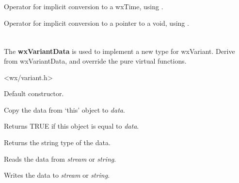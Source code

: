 
Operator for implicit conversion to a wxTime, using .

\label{wxvariantvoid}


Operator for implicit conversion to a pointer to a void, using .

\section{}\label{wxvariantdata}

The {\bf wxVariantData} is used to implement a new type for wxVariant. Derive from wxVariantData,
and override the pure virtual functions.




<wx/variant.h>




\label{wxvariantdatactor}


Default constructor.

\label{wxvariantdatacopy}


Copy the data from `this' object to {\it data}.

\label{wxvariantdataeq}


Returns TRUE if this object is equal to {\it data}.

\label{wxvariantdatagettype}


Returns the string type of the data.

\label{wxvariantdataread}



Reads the data from {\it stream} or {\it string}.

\label{wxvariantdatawrite}



Writes the data to {\it stream} or {\it string}.



